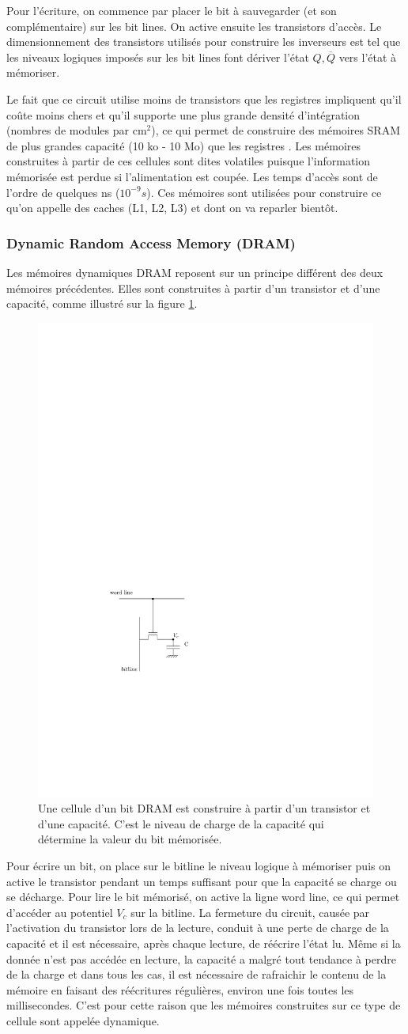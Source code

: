 Pour l'écriture, on commence par placer le bit à sauvegarder (et son complémentaire) sur les bit lines. On active ensuite les transistors d'accès. Le dimensionnement des transistors utilisés pour construire les inverseurs est tel que les niveaux logiques imposés sur les bit lines font dériver l'état $Q, \overline{Q}$ vers l'état à mémoriser.

Le fait que ce circuit utilise moins de transistors que les registres impliquent qu'il coûte moins chers et qu'il supporte une plus grande densité d'intégration (nombres de modules par cm$^2$), ce qui permet de construire des mémoires SRAM de plus grandes capacité (10 ko - 10 Mo) que les registres . Les mémoires construites à partir de ces cellules sont dites volatiles puisque l'information mémorisée est perdue si l'alimentation est coupée. Les temps d'accès sont de l'ordre de quelques ns ($10^{-9} s$). Ces mémoires sont utilisées pour construire ce qu'on appelle des caches (L1, L2, L3) et dont on va reparler bientôt.


\subsubsection{Dynamic Random Access Memory (DRAM)}

Les mémoires dynamiques DRAM reposent sur un principe différent des deux mémoires précédentes. Elles sont construites à partir d'un transistor et d'une capacité, comme illustré sur la figure \ref{fig:mem_dram}.

\begin{figure}[htbp]
\centering\includegraphics[width=0.2\linewidth]{Figs/dram_inner.pdf}
\caption{\label{fig:mem_dram} Une cellule d'un bit DRAM est construire à partir d'un transistor et d'une capacité. C'est le niveau de charge de la capacité qui détermine la valeur du bit mémorisée.}
\end{figure}
Pour écrire un bit, on place sur le bitline le niveau logique à mémoriser puis on active le transistor pendant un temps suffisant pour que la capacité se charge ou se décharge. Pour lire le bit mémorisé, on active la ligne word line, ce qui permet d'accéder au potentiel $V_c$ sur la bitline. La fermeture du circuit, causée par l'activation du transistor lors de la lecture, conduit à une perte de charge de la capacité et il est nécessaire, après chaque lecture, de réécrire l'état lu. Même si la donnée n'est pas accédée en lecture, la capacité a malgré tout tendance à perdre de la charge et dans tous les cas, il est nécessaire de rafraichir le contenu de la mémoire en faisant des réécritures régulières, environ une fois toutes les millisecondes. C'est pour cette raison que les mémoires construites sur ce type de cellule sont appelée dynamique.

